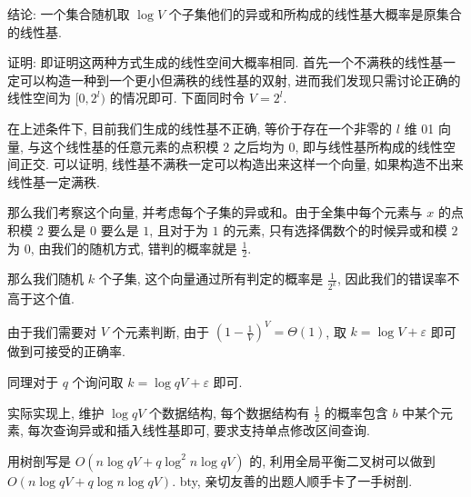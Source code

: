 \documentclass[a4paper, 12pt]{ctexart}
\begin{document}
结论: 一个集合随机取 $\log V$ 个子集他们的异或和所构成的线性基大概率是原集合的线性基.

证明: 即证明这两种方式生成的线性空间大概率相同. 首先一个不满秩的线性基一定可以构造一种到一个更小但满秩的线性基的双射, 进而我们发现只需讨论正确的线性空间为 $[0, 2^l)$ 的情况即可. 下面同时令 $V = 2^l$.

在上述条件下, 目前我们生成的线性基不正确, 等价于存在一个非零的 $l$ 维 01 向量, 与这个线性基的任意元素的点积模 $2$ 之后均为 $0$, 即与线性基所构成的线性空间正交. 可以证明, 线性基不满秩一定可以构造出来这样一个向量, 如果构造不出来线性基一定满秩.

那么我们考察这个向量, 并考虑每个子集的异或和。由于全集中每个元素与 $x$ 的点积模 $2$ 要么是 $0$ 要么是 $1$, 且对于为 $1$ 的元素, 只有选择偶数个的时候异或和模 $2$ 为 $0$, 由我们的随机方式, 错判的概率就是 $\frac{1}{2}$.

那么我们随机 $k$ 个子集, 这个向量通过所有判定的概率是 $\frac{1}{2^k}$, 因此我们的错误率不高于这个值.

由于我们需要对 $V$ 个元素判断, 由于 ${(1 - \frac{1}{V})}^V = \Theta(1)$, 取 $k=\log V+\varepsilon$ 即可做到可接受的正确率.

同理对于 $q$ 个询问取 $k=\log qV+\varepsilon$ 即可.

实际实现上, 维护 $\log qV$ 个数据结构, 每个数据结构有 $\frac{1}{2}$ 的概率包含 $b$ 中某个元素, 每次查询异或和插入线性基即可, 要求支持单点修改区间查询.

用树剖写是 $O(n \log qV + q \log^2 n \log qV)$ 的, 利用全局平衡二叉树可以做到 $O(n \log qV + q \log n \log qV)$. bty, 亲切友善的出题人顺手卡了一手树剖.
\end{document}
